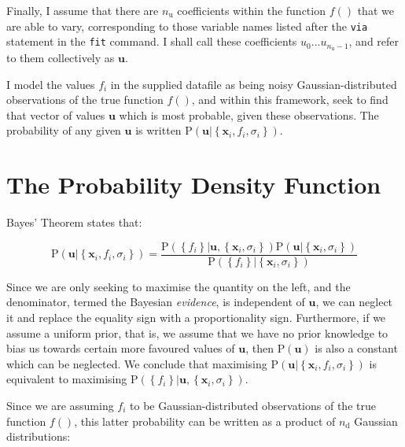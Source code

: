 \documentclass[a4paper,onecolumn,11pt]{book}
\begin{document}
Finally, I assume that there are $n_\mathrm{u}$ coefficients within the
function $f()$ that we are able to vary, corresponding to those variable names
listed after the \texttt{via} statement in the \texttt{fit} command. I shall
call these coefficients $u_0$...$u_{n_\mathrm{u}-1}$, and refer to them
collectively as $\mathbf{u}$.

I model the values $f_i$ in the supplied datafile as being noisy
Gaussian-distributed observations of the true function $f()$, and within this
framework, seek to find that vector of values $\mathbf{u}$ which is most
probable, given these observations. The probability of any given $\mathbf{u}$
is written
$\mathrm{P}\left( \mathbf{u} | \left\{ \mathbf{x}_i, f_i, \sigma_i \right\} \right)$.

\section{The Probability Density Function}
\label{bayes_pdf}

Bayes' Theorem states that:

\begin{equation}
\mathrm{P}\left( \mathbf{u} | \left\{ \mathbf{x}_i, f_i, \sigma_i \right\} \right) =
\frac{
\mathrm{P}\left( \left\{f_i \right\} | \mathbf{u}, \left\{ \mathbf{x}_i, \sigma_i \right\} \right)
\mathrm{P}\left( \mathbf{u} | \left\{ \mathbf{x}_i, \sigma_i \right\} \right)
}{
\mathrm{P}\left( \left\{f_i \right\} | \left\{ \mathbf{x}_i, \sigma_i \right\} \right)
}
\end{equation}

Since we are only seeking to maximise the quantity on the left, and the
denominator, termed the Bayesian \textit{evidence}, is independent of
$\mathbf{u}$, we can neglect it and replace the equality sign with a
proportionality sign.  Furthermore, if we assume a uniform prior, that is, we
assume that we have no prior knowledge to bias us towards certain more favoured
values of $\mathbf{u}$, then $\mathrm{P}\left( \mathbf{u} \right)$ is also a
constant which can be neglected. We conclude that maximising $\mathrm{P}\left(
\mathbf{u} | \left\{ \mathbf{x}_i, f_i, \sigma_i \right\} \right)$ is
equivalent to maximising $\mathrm{P}\left( \left\{f_i \right\} | \mathbf{u},
\left\{ \mathbf{x}_i, \sigma_i \right\} \right)$.

Since we are assuming $f_i$ to be Gaussian-distributed observations of the true
function $f()$, this latter probability can be written as a product of
$n_\mathrm{d}$ Gaussian distributions:
\end{document}
